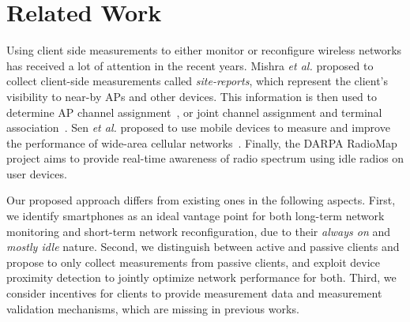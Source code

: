 \section{Related Work}
\label{sec:related}

Using client side measurements to either monitor or reconfigure
wireless networks has received a lot of attention in the recent
years. Mishra \textit{et al.}  proposed to collect client-side
measurements called \textit{site-reports}, which represent the client's
visibility to near-by APs and other devices. This information is then used to determine AP channel
assignment~\cite{mishra:mccr2005,dasilva:mswim2008,mishra:mobicom2006},
or joint channel assignment and terminal
association~\cite{mishra:infocom2006}. Sen \textit{et al.} proposed to
use mobile devices to measure and improve the performance of wide-area
cellular networks~\cite{sen2011can}. Finally, the DARPA
RadioMap~\cite{radiomap} project aims to provide real-time awareness of
radio spectrum using idle radios on user devices.

Our proposed approach differs from existing ones in the following
aspects. First, we identify smartphones as an ideal vantage point for
both long-term network monitoring and short-term network
reconfiguration, due to their \textit{always on } and \textit{mostly
  idle} nature. Second, we distinguish between active and passive
clients and propose to only collect measurements from passive clients,
and exploit device proximity detection to jointly optimize network
performance for both. Third, we consider incentives for clients to
provide measurement data and measurement validation mechanisms, which
are missing in previous works.
